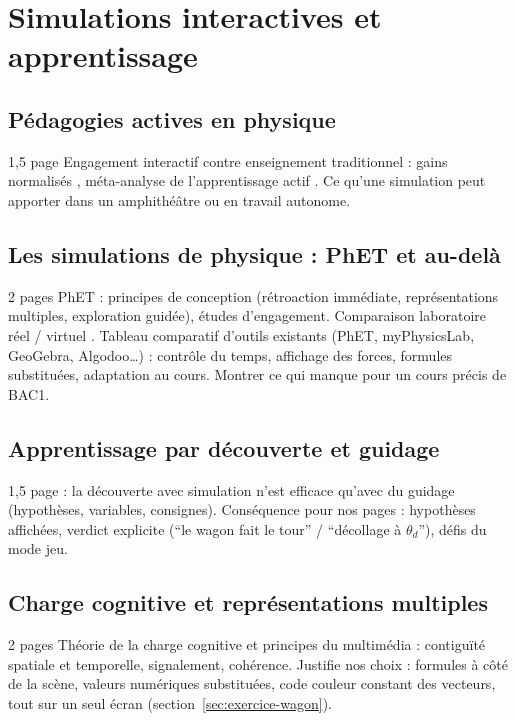 
\chapter{Simulations interactives et apprentissage}
\label{chap:simulations}

\section{Pédagogies actives en physique}

\begin{arediger}{1,5 page}
Engagement interactif contre enseignement traditionnel : gains normalisés
\parencite{hake1998}, méta-analyse de l'apprentissage actif \parencite{freeman2014}.
Ce qu'une simulation peut apporter dans un amphithéâtre ou en travail
autonome.
\end{arediger}

\section{Les simulations de physique : PhET et au-delà}

\begin{arediger}{2 pages}
PhET \parencite{wieman2008phet, adams2008phet} : principes de conception
(rétroaction immédiate, représentations multiples, exploration guidée),
études d'engagement. Comparaison laboratoire réel / virtuel
\parencite{finkelstein2005}. Tableau comparatif d'outils existants (PhET,
myPhysicsLab, GeoGebra, Algodoo…) : contrôle du temps, affichage des
forces, formules substituées, adaptation au cours. Montrer ce qui manque
pour un cours précis de BAC1.
\end{arediger}

\section{Apprentissage par découverte et guidage}

\begin{arediger}{1,5 page}
\textcite{dejong1998} : la découverte avec simulation n'est efficace qu'avec
du guidage (hypothèses, variables, consignes). Conséquence pour nos pages :
hypothèses affichées, verdict explicite (\enquote{le wagon fait le tour} /
\enquote{décollage à \(\theta_d\)}), défis du mode jeu.
\end{arediger}

\section{Charge cognitive et représentations multiples}

\begin{arediger}{2 pages}
Théorie de la charge cognitive \parencite{sweller1988} et principes du
multimédia \parencite{mayer2009} : contiguïté spatiale et temporelle,
signalement, cohérence. Justifie nos choix : formules à côté de la scène,
valeurs numériques substituées, code couleur constant des vecteurs, tout sur
un seul écran (section~\ref{sec:exercice-wagon}).
\end{arediger}
